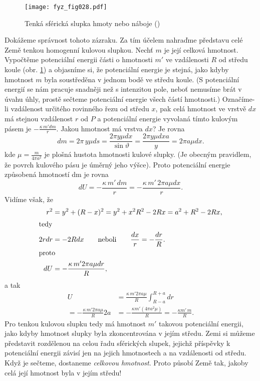 {    \begin{figure}[ht!]  %
      \centering
      \texttt{[image: fyz\_fig028.pdf]}
      \caption{Tenká sférická slupka hmoty nebo náboje (\cite[s.~195]{Feynman01})}
      \label{fyz:fig028}
    \end{figure}
    Dokážeme správnost tohoto zázraku. Za tím účelem nahraďme představu celé Země tenkou homogenní 
    kulovou slupkou. Nechť \(m\) je její celková hmotnost. Vypočtěme potenciální energii části o 
    hmotnosti \(m'\) ve vzdálenosti \(R\) od středu koule (obr. \ref{fyz:fig028}) a objasníme si, 
    že potenciální energie je stejná, jako kdyby hmotnost \(m\) byla soustředěna v jednom bodě ve 
    středu koule. (S potenciální energií se nám pracuje snadněji než s intenzitou pole, neboť 
    nemusíme brát v úvahu úhly, prostě sečteme potenciální energie všech částí hmotnosti.) 
    Označíme-li vzdálenost určitého rovinného řezu od středu \(x\), pak celá hmotnost ve vrstvě 
    \(dx\) má stejnou vzdálenost \(r\) od \(P\) a potenciální energie vyvolaná tímto kulovým pásem 
    je \(-\frac{\kappa\,m'dm}{r}\). Jakou hmotnost má vrstva \(dx\)? Je rovna
    \begin{equation}\label{FYZ:eq049}
      dm = 2\pi\,y\mu ds = \frac{2\pi y\mu dx}{\sin\vartheta} 
         = \frac{2\pi y\mu dxa}{y} = 2\pi a\mu dx.
    \end{equation}
    kde \(\mu = \frac{m}{4\pi a^2}\) je plošná hustota hmotnosti kulové slupky. (Je obecným 
    pravidlem, že povrch kulového pásu je úměrný jeho výšce). Proto potenciální energie způsobená 
    hmotností dm je rovna
    \begin{equation}\label{FYZ:eq050}
      dU = -\frac{\kappa\,m'\,dm}{r} = -\frac{\kappa\,m'\,2\pi a\mu dx}{r}.
    \end{equation}
    Vidíme však, že
    \begin{align*}
      r^2  &= y^2 + (R-x)^2 = y^2 + x^2 R^2 - 2Rx = a^2 + R^2 - 2Rx,           \\
      \shortintertext{tedy}
      2rdr &= -2Rdx \qquad \text{neboli} \qquad \frac{dx}{r} = - \frac{dr}{R}. \\
      \shortintertext{proto}
      dU   &= - \frac{\kappa\,m'2\pi a\mu dr}{R},
    \end{align*}
    a tak
    \begin{align}
      U  &=   \frac{\kappa\,m'2\pi a\mu}{R}\int_{R-a}^{R+a}dr               \nonumber \\ 
          = - \frac{\kappa\,m'2\pi a\mu}{R}2a                                
         &= - \frac{\kappa m'(4\pi a^2\mu)}{R} = -\frac{\kappa m'\,m}{R}.    \label{FYZ:eq051}
    \end{align}    
    Pro tenkou kulovou slupku tedy má hmotnost \(m'\) takovou potenciální energii, jako kdyby 
    hmotnost slupky byla zkoncentrována v jejím středu. Zemi si můžeme představit rozdělenou na 
    celou řadu sférických slupek, jejichž příspěvky k potenciální energii závisí jen na jejich 
    hmotnostech a na vzdálenosti od středu. Když je sečteme, dostaneme \emph{celkovou hmotnost}. 
    Proto působí Země tak, jakoby celá její hmotnost byla v jejím středu!
    
}
